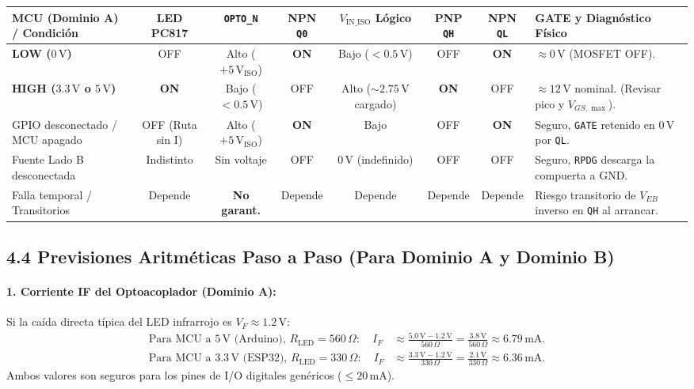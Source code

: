 \documentclass[10pt, a4paper, landscape]{article}
\begin{document}
\par\vspace{0.1cm}\noindent
\renewcommand{\arraystretch}{1.2}
{\footnotesize
\begin{tabularx}{\linewidth}{|l|c|c|c|c|c|c|X|}
\hline
\rowcolor{ucbgray}
\textbf{MCU (Dominio A) / Condición} & \textbf{LED PC817} & \textbf{\texttt{OPTO\_N}} & \textbf{NPN \texttt{Q0}} & \textbf{\texttt{$V_{\text{IN\_ISO}}$} Lógico} & \textbf{PNP \texttt{QH}} & \textbf{NPN \texttt{QL}} & \textbf{GATE y Diagnóstico Físico} \\ \hline
\textbf{LOW ($0\,\text{V}$)} & OFF & Alto ($+5\,\text{V}_{\text{ISO}}$) & \textbf{ON} & Bajo ($< 0.5\,\text{V}$) & OFF & \textbf{ON} & $\approx 0\,\text{V}$ (MOSFET OFF). \\ \hline
\textbf{HIGH ($3.3\,\text{V}$ o $5\,\text{V}$)} & \textbf{ON} & Bajo ($< 0.5\,\text{V}$) & OFF & Alto ($\sim 2.75\,\text{V}$ cargado) & \textbf{ON} & OFF & $\approx 12\,\text{V}$ nominal. (Revisar pico y $V_{GS,\max}$). \\ \hline
GPIO desconectado / MCU apagado & OFF (Ruta sin I) & Alto ($+5\,\text{V}_{\text{ISO}}$) & \textbf{ON} & Bajo & OFF & \textbf{ON} & Seguro, \texttt{GATE} retenido en $0\,\text{V}$ por \texttt{QL}. \\ \hline
Fuente Lado B desconectada & Indistinto & Sin voltaje & OFF & $0\,\text{V}$ (indefinido) & OFF & OFF & Seguro, \texttt{RPDG} descarga la compuerta a GND. \\ \hline
Falla temporal / Transitorios & Depende & \textbf{No garant.} & Depende & Depende & Depende & Depende & Riesgo transitorio de $V_{EB}$ inverso en \texttt{QH} al arrancar. \\ \hline
\end{tabularx}
}

\subsection*{4.4 Previsiones Aritméticas Paso a Paso (Para Dominio A y Dominio B)}

\paragraph{1. Corriente IF del Optoacoplador (Dominio A):}
Si la caída directa típica del LED infrarrojo es $V_F \approx 1.2\,\text{V}$:
\begin{align}
    \text{Para MCU a } 5\,\text{V} \text{ (Arduino), } R_{\text{LED}} = 560\,\Omega: \quad I_F &\approx \frac{5.0\,\text{V} - 1.2\,\text{V}}{560\,\Omega} = \frac{3.8\,\text{V}}{560\,\Omega} \approx 6.79\,\text{mA}. \\
    \text{Para MCU a } 3.3\,\text{V} \text{ (ESP32), } R_{\text{LED}} = 330\,\Omega: \quad I_F &\approx \frac{3.3\,\text{V} - 1.2\,\text{V}}{330\,\Omega} = \frac{2.1\,\text{V}}{330\,\Omega} \approx 6.36\,\text{mA}.
\end{align}
Ambos valores son seguros para los pines de I/O digitales genéricos ($\le 20\,\text{mA}$).
\end{document}
